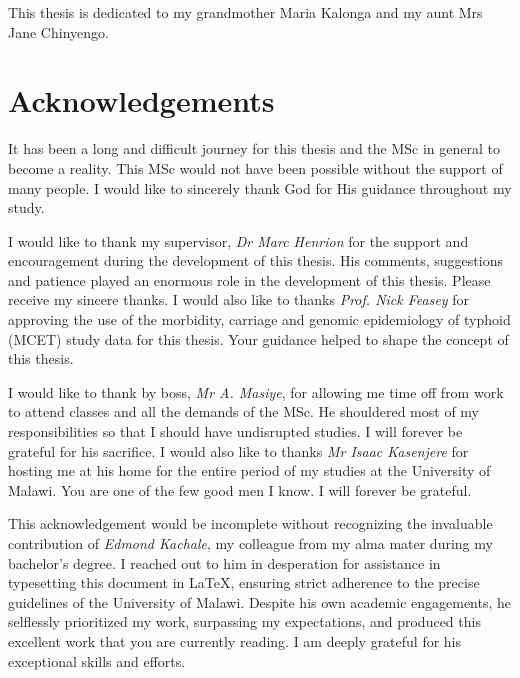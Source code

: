 
This thesis is dedicated to my grandmother Maria Kalonga and my aunt Mrs Jane Chinyengo.


\newpage

\thispagestyle{empty}

\chapter*{Acknowledgements}

It has been a long and difficult journey for this thesis and the MSc in general to become a reality. This MSc would not have been possible without the support of many people. I would like to sincerely thank God for His guidance throughout my study.

I would like to thank my supervisor, \emph{Dr Marc Henrion} for the support and encouragement during the development of this thesis. His comments, suggestions and patience played an enormous role in the development of this thesis. Please receive my sincere thanks. I would also like to thanks \emph{Prof. Nick Feasey} for approving the use of the morbidity, carriage and genomic epidemiology of typhoid (MCET) study data for this thesis. Your guidance helped to shape the concept of this thesis.

I would like to thank by boss, \emph{Mr A. Masiye}, for allowing me time off from work to attend classes and all the demands of the MSc. He shouldered most of my responsibilities so that I should have undisrupted studies. I will forever be grateful for his sacrifice. I would also like to thanks \emph{Mr Isaac Kasenjere} for hosting me at his home for the entire period of my studies at the University of Malawi. You are one of the few good men I know. I will forever be grateful.

This acknowledgement would be incomplete without recognizing the invaluable contribution of \emph{Edmond Kachale}, my colleague from my alma mater during my bachelor's degree. I reached out to him in desperation for assistance in typesetting this document in \LaTeX, ensuring strict adherence to the precise guidelines of the University of Malawi. Despite his own academic engagements, he selflessly prioritized my work, surpassing my expectations, and produced this excellent work that you are currently reading. I am deeply grateful for his exceptional skills and efforts.


